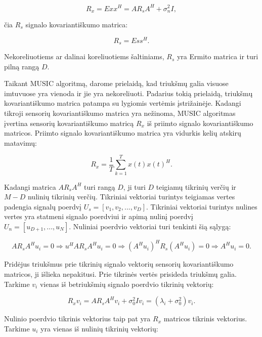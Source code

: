 \documentclass[main.tex]{subfiles}
\begin{document}
\begin{equation}
    R_x = E{xx^H} = AR_sA^H + \sigma^2_n I,
\end{equation}

\noindent čia $R_s$ signalo kovariantiškumo matrica:

\begin{equation}
    R_s=E{ss^H}.
\end{equation}

\noindent Nekoreliuotiems ar dalinai koreliuotiems šaltiniams, $R_s$ yra Ermito matrica
ir turi pilną rangą $D$.

Taikant MUSIC algoritmą, darome prielaidą, kad triukšmų galia visuose imtuvuose yra vienoda
ir jie yra nekoreliuoti. Padarius tokią prielaidą, triukšmų kovariantiškumo matrica patampa
su lygiomis vertėmis įstrižainėje. Kadangi tikroji sensorių kovariantiškumo matrica
yra nežinoma, MUSIC algoritmas įvertina sensorių kovariantiškumo matricą $R_x$
iš priimto signalo kovariantiškumo matricos. Priimto signalo kovariantiškumo matrica
yra vidurkis kelių atskirų matavimų:

\begin{equation}
    R_x = \frac{1}{T} \sum^T_{k=1} {x(t)x(t)^H}.
\end{equation}

Kadangi matrica $AR_sA^H$ turi rangą $D$, ji turi $D$ teigiamų tikrinių verčių ir
$M-D$ nulinių tikrinių verčių.
Tikriniai vektoriai turintys teigiamas vertes padengia signalų poerdvį $U_s=[v_1,v_2,...,v_D]$.
Tikriniai vektoriai turintys nulines vertes yra statmeni signalo poerdviui ir apimą
nulinį poerdvį $U_n=[u_{D+1},...,u_N]$. Nuliniai poerdvio vektoriai turi tenkinti
šią sąlygą:

\begin{equation}
    AR_sA^Hu_i=0 \Rightarrow u^HAR_sA^Hu_i = 0 \Rightarrow (A^Hu_i)^HR_s(A^Hu_i)=0 \Rightarrow A^Hu_i=0.
\end{equation}

Pridėjus triukšmus prie tikrinių signalo vektorių sensorių kovariantiškumo matricos, ji
išlieka nepakitusi. Prie tikrinės vertės prisideda triukšmų galia. Tarkime
$v_i$ vienas iš betriukšmių signalo poerdvio tikrinių vektorių:

\begin{equation}
    R_xv_i=AR_sA^Hv_i+\sigma^2_0Iv_i = (\lambda_i + \sigma^2_0)v_i.
\end{equation}

\noindent Nulinio poerdvio tikrinis vektorius taip pat yra $R_x$ matricos tikrinis
vektorius. Tarkime $u_i$ yra vienas iš nulinių tikrinių vektorių:
\end{document}
